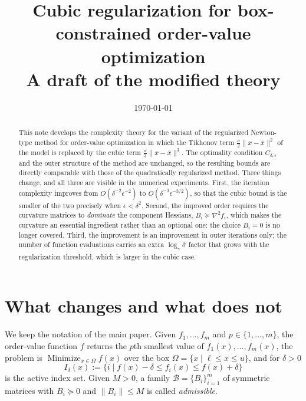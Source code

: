 \documentclass[11pt]{article}
\newcommand{\minimize}{\mathop{\text{Minimize}}}
\begin{document}
\title{Cubic regularization for box-constrained order-value optimization\\
\large A draft of the modified theory}
\date{\today}
\maketitle

\begin{abstract}
This note develops the complexity theory for the variant of the regularized
Newton-type method for order-value optimization in which the Tikhonov term
$\tfrac{\sigma}{2}\|x - \bar{x}\|^2$ of the model is replaced by the cubic term
$\tfrac{\sigma}{3}\|x - \bar{x}\|^3$. The optimality condition
$C_{\delta,\epsilon}$ and the outer structure of the method are unchanged, so
the resulting bounds are directly comparable with those of the quadratically
regularized method. Three things change, and all three are visible in the
numerical experiments. First, the iteration complexity improves from
$O(\delta^{-2}\epsilon^{-2})$ to $O(\delta^{-3}\epsilon^{-3/2})$, so that the
cubic bound is the smaller of the two precisely when $\epsilon < \delta^{2}$.
Second, the improved order requires the curvature matrices to \emph{dominate}
the component Hessians, $B_i \succeq \nabla^2 f_i$, which makes the curvature an
essential ingredient rather than an optional one: the choice $B_i = 0$ is no
longer covered. Third, the improvement is an improvement in outer iterations
only; the number of function evaluations carries an extra
$\log_\gamma \bar{\sigma}$ factor that grows with the regularization threshold,
which is larger in the cubic case.
\end{abstract}

\section{What changes and what does not}

We keep the notation of the main paper. Given $f_1,\dots,f_m$ and
$p \in \{1,\dots,m\}$, the order-value function $f$ returns the $p$th smallest
value of $f_1(x),\dots,f_m(x)$, the problem is
$\minimize_{x \in \Omega} f(x)$ over the box
$\Omega = \{x \mid \ell \leq x \leq u\}$, and for $\delta > 0$
\[
I_\delta(x) := \{ i \mid f(x) - \delta \leq f_i(x) \leq f(x) + \delta \}
\]
is the active index set. Given $M > 0$, a family
$\mathcal{B} = \{B_i\}_{i=1}^m$ of symmetric matrices with $B_i \succeq 0$ and
$\|B_i\| \leq M$ is called \emph{admissible}.
\end{document}
